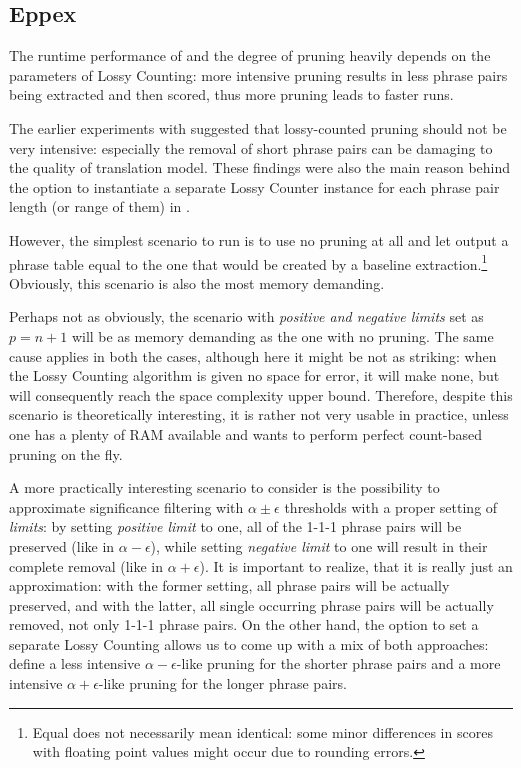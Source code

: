 \subsection{Eppex}

The runtime performance of \eppex{} and the degree of pruning heavily depends
on the parameters of Lossy Counting: more intensive pruning results in less phrase pairs
being extracted and then scored, thus more pruning leads to faster \eppex{} runs.

The earlier experiments with \eppex{} \citep{przywara:eppex} suggested that lossy-counted
pruning should not be very intensive: especially the removal of short phrase pairs can be
damaging to the quality of translation model.
These findings were also the main reason behind the option to instantiate a separate
Lossy Counter instance for each phrase pair length (or range of them) in \eppex{}.

However, the simplest scenario to run is to use no pruning at all and let \eppex{} output
a phrase table equal to the one that would be created by a baseline extraction.\footnote{Equal
does not necessarily mean identical: some minor differences in scores with floating point
values might occur due to rounding errors.}
Obviously, this scenario is also the most memory demanding.

Perhaps not as obviously, the scenario with \emph{positive and negative limits} set as
$p = n + 1$ will be as memory demanding as the one with no pruning.
The same cause applies in both the cases, although here it might be not as striking:
when the Lossy Counting algorithm is given no space for error, it will make none,
but will consequently reach the space complexity upper bound.
Therefore, despite this scenario is theoretically interesting, it is rather not very
usable in practice, unless one has a plenty of RAM available and wants to perform perfect
count-based pruning on the fly.

A more practically interesting scenario to consider is the possibility to approximate
significance filtering with $\alpha \pm \epsilon$ thresholds with a proper setting of
\emph{limits}: by setting \emph{positive limit} to one, all of the 1-1-1 phrase pairs
will be preserved (like in $\alpha - \epsilon$), while setting \emph{negative limit} to
one will result in their complete removal (like in $\alpha + \epsilon$).
It is important to realize, that it is really just an approximation:
with the former setting, all phrase pairs will be actually preserved,
and with the latter, all single occurring phrase pairs will be actually removed,
not only 1-1-1 phrase pairs.
On the other hand, the option to set a separate Lossy Counting allows us to come up with
a mix of both approaches: define a less intensive $\alpha - \epsilon$-like pruning for
the shorter phrase pairs and a more intensive $\alpha + \epsilon$-like pruning for the
longer phrase pairs.

